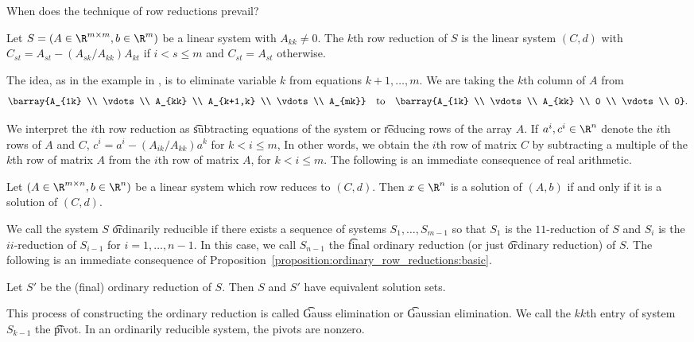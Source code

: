 

When does the technique of row reductions prevail?


Let $S = (A \in \R^{m \times m}, b \in \R^{m})$ be a linear system with $A_{kk} \neq 0$.
The \t{$k$th row reduction} of $S$ is the linear system $(C, d)$ with $C_{st} = A_{st} - (A_{sk}/A_{kk})A_{kt}$ if $i < s \leq m$ and $C_{st} = A_{st}$ otherwise.

The idea, as in the example in , is to eliminate variable $k$ from equations $k+1, \dots, m$.
We are taking the $k$th column of $A$ from
\[
  \barray{A_{1k} \\ \vdots \\ A_{kk} \\ A_{k+1,k} \\ \vdots \\ A_{mk}} \quad \text{to} \quad \barray{A_{1k} \\ \vdots \\ A_{kk} \\ 0 \\ \vdots \\ 0}.
\]

We interpret the $i$th row reduction as \t{subtracting equations} of the system or \t{reducing rows} of the array $A$.
If $a^i, c^i \in \R^{n}$ denote the $i$th rows of $A$ and $C$, $c^i = a^i - (A_{ik}/A_{kk})a^k$ for $k < i \leq m$,
In other words, we obtain the $i$th row of matrix $C$ by subtracting a multiple of the $k$th row of matrix $A$ from the $i$th row of matrix $A$, for $k < i \leq m$.
The following is an immediate consequence of real arithmetic.
\begin{proposition}
  Let $(A \in \R^{m \times n}, b \in \R^{n})$ be a linear system which row reduces to $(C, d)$.
  Then $x \in \R^{n}$ is a solution of $(A, b)$ if and only if it is a solution of $(C, d)$.  \label{proposition:ordinary_row_reductions:basic}
\end{proposition}


We call the system $S$ \t{ordinarily reducible} if there exists a sequence of systems $S_1, \dots, S_{m-1}$ so that $S_1$ is the $11$-reduction of $S$ and $S_{i}$ is the $ii$-reduction of $S_{i-1}$ for $i = 1, \dots, n-1$.
In this case, we call $S_{n-1}$ the \t{final ordinary reduction} (or just \t{ordinary reduction}) of $S$.
The following is an immediate consequence of Proposition~\ref{proposition:ordinary_row_reductions:basic}.
\begin{proposition}
	Let $S'$ be the (final) ordinary reduction of $S$. Then $S$ and $S'$ have equivalent solution sets.
	\label{proposition:ordinary_row_reductions:main}
\end{proposition}
This process of constructing the ordinary reduction is called \t{Gauss elimination} or \t{Gaussian elimination}.
We call the $kk$th entry of system $S_{k-1}$ the \t{pivot}.
In an ordinarily reducible system, the pivots are nonzero.

